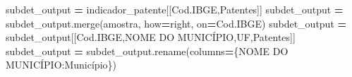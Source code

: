 \documentclass[
  12,
  dvipsnames]{article}
\newenvironment{Shaded}{\begin{snugshade}}{\end{snugshade}}
\newcommand{\NormalTok}[1]{#1}
\newcommand{\OperatorTok}[1]{\textcolor[rgb]{0.81,0.36,0.00}{\textbf{#1}}}
\newcommand{\StringTok}[1]{\textcolor[rgb]{0.31,0.60,0.02}{#1}}
\begin{document}
\begin{Shaded}
\begin{Highlighting}[]
\NormalTok{subdet\_output }\OperatorTok{=}\NormalTok{ indicador\_patente[[}\StringTok{\textquotesingle{}Cod.IBGE\textquotesingle{}}\NormalTok{,}\StringTok{\textquotesingle{}Patentes\textquotesingle{}}\NormalTok{]]}
\NormalTok{subdet\_output }\OperatorTok{=}\NormalTok{ subdet\_output.merge(amostra, how}\OperatorTok{=}\StringTok{\textquotesingle{}right\textquotesingle{}}\NormalTok{, on}\OperatorTok{=}\StringTok{\textquotesingle{}Cod.IBGE\textquotesingle{}}\NormalTok{)}
\NormalTok{subdet\_output }\OperatorTok{=}\NormalTok{ subdet\_output[[}\StringTok{\textquotesingle{}Cod.IBGE\textquotesingle{}}\NormalTok{,}\StringTok{\textquotesingle{}NOME DO MUNICÍPIO\textquotesingle{}}\NormalTok{,}\StringTok{\textquotesingle{}UF\textquotesingle{}}\NormalTok{,}\StringTok{\textquotesingle{}Patentes\textquotesingle{}}\NormalTok{]]}
\NormalTok{subdet\_output }\OperatorTok{=}\NormalTok{ subdet\_output.rename(columns}\OperatorTok{=}\NormalTok{\{}\StringTok{\textquotesingle{}NOME DO MUNICÍPIO\textquotesingle{}}\NormalTok{:}\StringTok{\textquotesingle{}Município\textquotesingle{}}\NormalTok{\})}


\end{Highlighting}
\end{Shaded}
\end{document}
